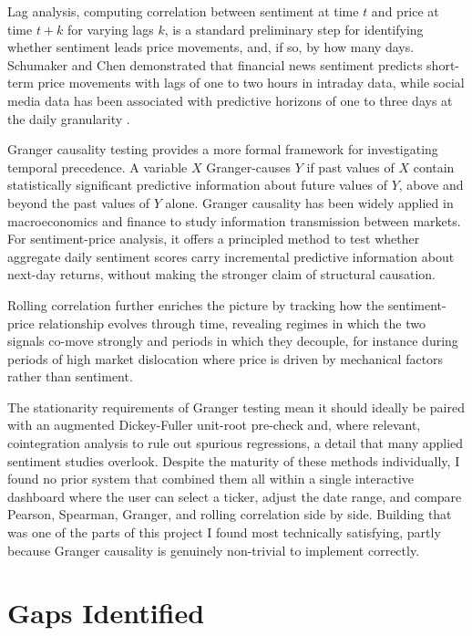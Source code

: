 Lag analysis, computing correlation between sentiment at time \(t\) and price at time \(t+k\) for varying lags \(k\), is a standard preliminary step for identifying whether sentiment leads price movements, and, if so, by how many days.  Schumaker and Chen \citep{schumaker2009textmining} demonstrated that financial news sentiment predicts short-term price movements with lags of one to two hours in intraday data, while social media data has been associated with predictive horizons of one to three days at the daily granularity \citep{bollen2011twitter}.

Granger causality testing \citep{granger1969} provides a more formal framework for investigating temporal precedence.  A variable $X$ Granger-causes $Y$ if past values of $X$ contain statistically significant predictive information about future values of $Y$, above and beyond the past values of $Y$ alone.  Granger causality has been widely applied in macroeconomics and finance to study information transmission between markets.  For sentiment-price analysis, it offers a principled method to test whether aggregate daily sentiment scores carry incremental predictive information about next-day returns, without making the stronger claim of structural causation.

Rolling correlation further enriches the picture by tracking how the sentiment-price relationship evolves through time, revealing regimes in which the two signals co-move strongly and periods in which they decouple, for instance during periods of high market dislocation where price is driven by mechanical factors rather than sentiment.

The stationarity requirements of Granger testing mean it should ideally be paired with an augmented Dickey-Fuller unit-root pre-check \citep{dickey1979distribution} and, where relevant, cointegration analysis \citep{engle1987cointegration} to rule out spurious regressions, a detail that many applied sentiment studies overlook.  Despite the maturity of these methods individually, I found no prior system that combined them all within a single interactive dashboard where the user can select a ticker, adjust the date range, and compare Pearson, Spearman, Granger, and rolling correlation side by side. Building that was one of the parts of this project I found most technically satisfying, partly because Granger causality is genuinely non-trivial to implement correctly.

\section{Gaps Identified}

